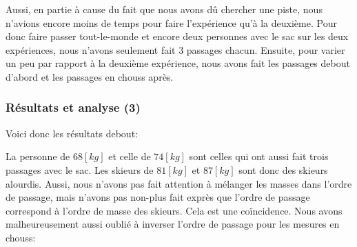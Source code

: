 \documentclass{article}
\begin{document}
\vspace{0.3cm}

Aussi, en partie à cause du fait que nous avons dû chercher une piste, nous n'avions encore moins de temps pour faire l'expérience qu'à la deuxième. Pour donc faire passer tout-le-monde et encore deux personnes avec le sac sur les deux expériences, nous n'avons seulement fait $3$ passages chacun. 
\newline Ensuite, pour varier un peu par rapport à la deuxième expérience, nous avons fait les passages debout d'abord et les passages en chouss après.


\subsubsection{Résultats et analyse (3)}

Voici donc les résultats debout:

\begin{center}
\end{center}

\vspace{0.3cm}

La personne de $68[kg]$ et celle de $74[kg]$ sont celles qui ont aussi fait trois passages avec le sac. Les skieurs de $81[kg]$ et $87[kg]$ sont donc des skieurs alourdis. 
\newline Aussi, nous n'avons pas fait attention à mélanger les masses dans l'ordre de passage, mais n'avons pas non-plus fait exprès que l'ordre de passage correspond à l'ordre de masse des skieurs. Cela est une coïncidence.
\newline Nous avons malheureusement aussi oublié à inverser l'ordre de passage pour les mesures en chouss:
\end{document}
